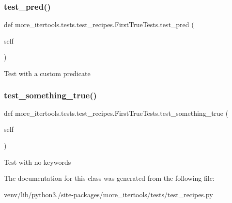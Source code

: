 \subsubsection{\texorpdfstring{test\+\_\+pred()}{test\_pred()}}
{\footnotesize\ttfamily def more\+\_\+itertools.\+tests.\+test\+\_\+recipes.\+First\+True\+Tests.\+test\+\_\+pred (\begin{DoxyParamCaption}\item[{}]{self }\end{DoxyParamCaption})}

\begin{DoxyVerb}Test with a custom predicate\end{DoxyVerb}
 \mbox{\label{classmore__itertools_1_1tests_1_1test__recipes_1_1_first_true_tests_a10924de9e39fa0c0a2d0b24206a7f0ee}} 
\subsubsection{\texorpdfstring{test\+\_\+something\+\_\+true()}{test\_something\_true()}}
{\footnotesize\ttfamily def more\+\_\+itertools.\+tests.\+test\+\_\+recipes.\+First\+True\+Tests.\+test\+\_\+something\+\_\+true (\begin{DoxyParamCaption}\item[{}]{self }\end{DoxyParamCaption})}

\begin{DoxyVerb}Test with no keywords\end{DoxyVerb}
 

The documentation for this class was generated from the following file\+:\begin{DoxyCompactItemize}
\item 
venv/lib/python3./site-\/packages/more\+\_\+itertools/tests/test\+\_\+recipes.\+py\end{DoxyCompactItemize}
